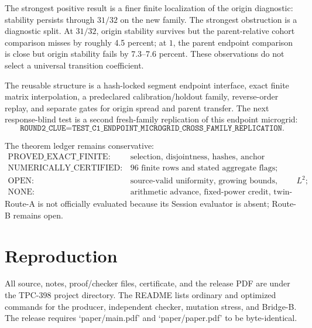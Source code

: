 \documentclass[10pt]{article}
\begin{document}
The strongest positive result is a finer finite localization of the origin
diagnostic: stability persists through \(31/32\) on the new family.  The
strongest obstruction is a diagnostic split.  At \(31/32\), origin stability
survives but the parent-relative cohort comparison misses by roughly 4.5
percent; at \(1\), the parent endpoint comparison is close but origin
stability fails by 7.3--7.6 percent.  These observations do not select a
universal transition coefficient.

The reusable structure is a hash-locked segment endpoint interface, exact
finite matrix interpolation, a predeclared calibration/holdout family,
reverse-order replay, and separate gates for origin spread and parent
transfer.  The next response-blind test is a second fresh-family replication
of this endpoint microgrid:
\[
 \texttt{ROUND2\_CLUE=TEST\_C1\_ENDPOINT\_MICROGRID\_CROSS\_FAMILY\_REPLICATION}.
\]

The theorem ledger remains conservative:
\[
\begin{array}{ll}
\mathrm{PROVED\_EXACT\_FINITE:}&\text{selection, disjointness, hashes, anchor identity;}\\
\mathrm{NUMERICALLY\_CERTIFIED:}&\text{96 finite rows and stated aggregate flags;}\\
\mathrm{OPEN:}&\text{source-valid uniformity, growing bounds, arithmetic }L^2;\\
\mathrm{NONE:}&\text{arithmetic advance, fixed-power credit, twin-prime result.}
\end{array}
\]
Route-A is not officially evaluated because its Session evaluator is absent;
Route-B remains open.

\section*{Reproduction}

All source, notes, proof/checker files, certificate, and the release PDF are
under the TPC-398 project directory.  The README lists ordinary and optimized
commands for the producer, independent checker, mutation stress, and Bridge-B.
The release requires `paper/main.pdf' and `paper/paper.pdf' to be
byte-identical.
\end{document}
